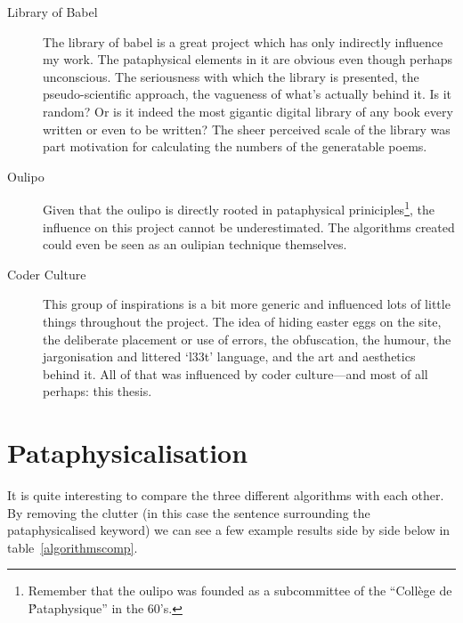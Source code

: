 \begin{description}
  \item[Library of Babel] The library of babel is a great project which has only indirectly influence my work. The pataphysical elements in it are obvious even though perhaps unconscious. The seriousness with which the library is presented, the pseudo-scientific approach, the vagueness of what's actually behind it. Is it random? Or is it indeed the most gigantic digital library of any book every written or even to be written? The sheer perceived scale of the library was part motivation for calculating the numbers of the generatable poems.
  \item[Oulipo] Given that the \gls{oulipo} is directly rooted in pataphysical priniciples\footnote{Remember that the \gls{oulipo} was founded as a subcommittee of the ``Coll\`{e}ge de \'Pataphysique'' in the 60's.}, the influence on this project cannot be underestimated. The algorithms created could even be seen as an oulipian technique themselves.
  \item[Coder Culture] This group of inspirations is a bit more generic and influenced lots of little things throughout the project. The idea of hiding easter eggs on the site, the deliberate placement or use of errors, the obfuscation, the humour, the jargonisation and littered `l33t' language, and the art and aesthetics behind it. All of that was influenced by coder culture---and most of all perhaps: this thesis.
\end{description}



\section{Pataphysicalisation}

It is quite interesting to compare the three different algorithms with each other. By removing the clutter (in this case the sentence surrounding the pataphysicalised keyword) we can see a few example results side by side below in table~\ref{algorithmscomp}.

